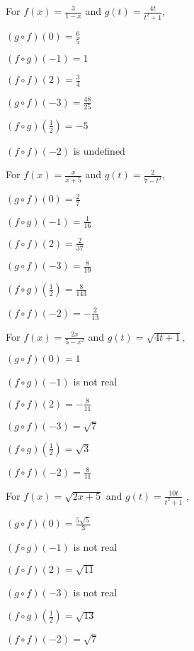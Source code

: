 \begin{exenum}
\item  For  $f(x) = \frac{3}{1-x}$ and $g(t) = \frac{4t}{t^2+1}$,
\begin{shortitemize}[MMMMMMMMMMM]
\item  $(g\circ f)(0) = \frac{6}{5}$
\item  $(f\circ g)(-1) = 1$
\item  $(f \circ f)(2) = \frac{3}{4}$
\item  $(g\circ f)(-3) = \frac{48}{25}$
\item  $(f\circ g)\left(\frac{1}{2}\right) = -5$
\item  $(f \circ f)(-2)$ is undefined
\end{shortitemize}

\item  For  $f(x) = \frac{x}{x+5}$ and $g(t) = \frac{2}{7-t^2}$,
\begin{shortitemize}[MMMMMMMMMMM]
\item  $(g\circ f)(0) = \frac{2}{7}$
\item  $(f\circ g)(-1) = \frac{1}{16}$
\item  $(f \circ f)(2) = \frac{2}{37}$
\item  $(g\circ f)(-3) = \frac{8}{19}$
\item  $(f\circ g)\left(\frac{1}{2}\right) = \frac{8}{143}$
\item  $(f \circ f)(-2) = -\frac{2}{13}$
\end{shortitemize}

\item  For  $f(x) = \frac{2x}{5-x^2}$ and $g(t) = \sqrt{4t+1}$,
\begin{shortitemize}[MMMMMMMMMMM]
\item  $(g\circ f)(0) = 1$
\item  $(f\circ g)(-1)$ is not real
\item  $(f \circ f)(2) = -\frac{8}{11}$
\item  $(g\circ f)(-3) = \sqrt{7}$
\item  $(f\circ g)\left(\frac{1}{2}\right) = \sqrt{3}$
\item  $(f \circ f)(-2) = \frac{8}{11}$
\end{shortitemize}

\item  For  $f(x) =\sqrt{2x+5}$ and $g(t) = \frac{10t}{t^2+1}$ ,
\begin{shortitemize}[MMMMMMMMMMM]
\item  $(g\circ f)(0) = \frac{5\sqrt{5}}{3}$
\item  $(f\circ g)(-1)$ is not real
\item  $(f \circ f)(2) = \sqrt{11}$
\item  $(g\circ f)(-3)$ is not real
\item  $(f\circ g)\left(\frac{1}{2}\right) = \sqrt{13}$
\item  $(f \circ f)(-2) = \sqrt{7}$
\end{shortitemize}

\end{exenum}

